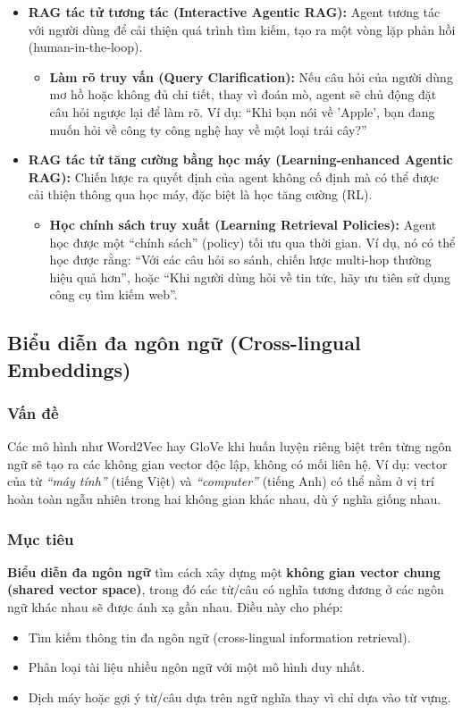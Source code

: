 \begin{itemize}
	\item \textbf{RAG tác tử tương tác (Interactive Agentic RAG):}
	Agent tương tác với người dùng để cải thiện quá trình tìm kiếm, tạo ra một vòng lặp phản hồi (human-in-the-loop).
	\begin{itemize}
		\item \textbf{Làm rõ truy vấn (Query Clarification):}
		Nếu câu hỏi của người dùng mơ hồ hoặc không đủ chi tiết, thay vì đoán mò, agent sẽ chủ động đặt câu hỏi ngược lại để làm rõ. Ví dụ: “Khi bạn nói về 'Apple', bạn đang muốn hỏi về công ty công nghệ hay về một loại trái cây?”
	\end{itemize}
	
	\item \textbf{RAG tác tử tăng cường bằng học máy (Learning-enhanced Agentic RAG):}
	Chiến lược ra quyết định của agent không cố định mà có thể được cải thiện thông qua học máy, đặc biệt là học tăng cường (RL).
	\begin{itemize}
		\item \textbf{Học chính sách truy xuất (Learning Retrieval Policies):}
		Agent học được một “chính sách” (policy) tối ưu qua thời gian. Ví dụ, nó có thể học được rằng: “Với các câu hỏi so sánh, chiến lược multi-hop thường hiệu quả hơn”, hoặc “Khi người dùng hỏi về tin tức, hãy ưu tiên sử dụng công cụ tìm kiếm web”.
	\end{itemize}
\end{itemize}

\subsection{Biểu diễn đa ngôn ngữ (Cross-lingual Embeddings)}
\label{ssec:cross_lingual_embeddings}

\subsubsection*{Vấn đề}
Các mô hình như Word2Vec hay GloVe khi huấn luyện riêng biệt trên từng ngôn ngữ sẽ tạo ra các không gian vector độc lập, không có mối liên hệ.  
Ví dụ: vector của từ \textit{“máy tính”} (tiếng Việt) và \textit{“computer”} (tiếng Anh) có thể nằm ở vị trí hoàn toàn ngẫu nhiên trong hai không gian khác nhau, dù ý nghĩa giống nhau.

\subsubsection*{Mục tiêu}
\textbf{Biểu diễn đa ngôn ngữ} tìm cách xây dựng một \textbf{không gian vector chung (shared vector space)}, trong đó các từ/câu có nghĩa tương đương ở các ngôn ngữ khác nhau sẽ được ánh xạ gần nhau. Điều này cho phép:
\begin{itemize}
	\item Tìm kiếm thông tin đa ngôn ngữ (cross-lingual information retrieval).
	\item Phân loại tài liệu nhiều ngôn ngữ với một mô hình duy nhất.
	\item Dịch máy hoặc gợi ý từ/câu dựa trên ngữ nghĩa thay vì chỉ dựa vào từ vựng.
\end{itemize}

